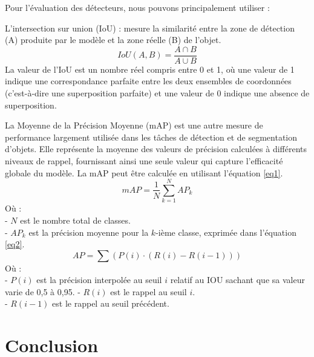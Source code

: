 Pour l'évaluation des détecteurs, nous pouvons principalement utiliser :
\begin{outline}
\1 L'intersection sur union (IoU) : mesure la similarité entre la zone de détection (A) produite par le modèle et la zone réelle (B) de l'objet. 
    \begin{equation}
    IoU(A, B) = \frac{A \cap B}{A \cup B}
    \end{equation}
La valeur de l'IoU est un nombre réel compris entre 0 et 1, où une valeur de 1 indique une correspondance parfaite entre les deux ensembles de coordonnées (c'est-à-dire une superposition parfaite) et une valeur de 0 indique une absence de superposition. 


\1 La Moyenne de la Précision Moyenne (mAP) est une autre mesure de performance largement utilisée dans les tâches de détection et de segmentation d'objets. Elle représente la moyenne des valeurs de précision calculées à différents niveaux de rappel, fournissant ainsi une seule valeur qui capture l'efficacité globale du modèle. La mAP peut être calculée en utilisant l'équation \ref{eq1}.
\begin{equation}
mAP = \frac{1}{N} \sum_{k=1}^{N} AP_k
\label{eq1}
\end{equation}
Où :\\
- \(N\) est le nombre total de classes.\\
- \(AP_k\) est la précision moyenne pour la \(k\)-ième classe, exprimée dans l'équation \ref{eq2}.\\
\begin{equation}
AP = \sum(P(i) \cdot (R(i) - R(i-1)))
\label{eq2}
\end{equation}
Où :\\
- \(P(i)\) est la précision interpolée au seuil \(i\) relatif au IOU sachant que sa valeur varie de 0,5 à 0,95.
- \(R(i)\) est le rappel au seuil \(i\). \\
- \(R(i-1)\) est le rappel au seuil précédent.\\
\end{outline}

\section{Conclusion}

